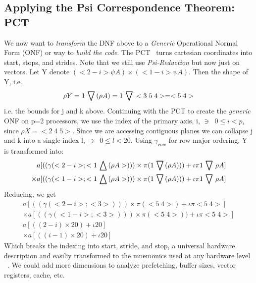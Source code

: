 \subsection* {Applying the Psi Correspondence Theorem: PCT}
We now want to {\em transform} the DNF above to a {\em Generic} Operational Normal Form (ONF) or way 
to {\em build the code}.  The PCT~\cite{muljen94} turns cartesian coordinates into start, stops, and strides.
Note that we still use {\em Psi-Reduction} but now just on vectors.  
Let Y denote $(<2-i> \psi A ) \times ( <1-i> \psi A)$. Then the shape of Y, i.e.
\begin{eqnarray}
\rho Y= 1 \,\bigtriangledown\, (\rho A) = 1 \,\bigtriangledown\, <3\;5\;4> = <5\;4>
\end{eqnarray}
i.e. the bounds for j and k  above.
Continuing with the PCT to create the {\em generic} ONF on p=2 processors, we use the index of the primary axis, i, $\ni\;\;0 \leq  i < p$, since $\rho X = <2\;4\;5>$.
Since we are accessing contiguous planes we can collapse j and k into a single index l, $\ni \;\; 0 \leq l <20$.
Using $\gamma_{row}$ for row major ordering, Y is transformed into:
\small
\begin{eqnarray}
a[ (( \gamma(<2-i >; <1 \,\bigtriangleup\, (\rho A>))) \times \pi ( 1 \,\bigtriangledown\, (\rho A))   )  + \iota \pi 1 \,\bigtriangledown\, \rho A  ] \nonumber \\
\times a[ (( \gamma(<1-i >; <1 \,\bigtriangleup\, (\rho A>))) \times \pi ( 1 \,\bigtriangledown\, (\rho A))   )  + \iota \pi 1 \,\bigtriangledown\, \rho A  ] 
\end{eqnarray}
Reducing, we get
\begin{eqnarray}
a[ (( \gamma(<2-i >; <3>))) \times \pi ( <5\;4>)  + \iota \pi <5\;4> ] \nonumber \\
\times a[ (( \gamma(<1-i >; <3>))) \times \pi ( <5\;4>)   )  + \iota \pi <5\;4>  ]\nonumber \\
a[( (2-i) \times  20)  + \iota 20 ] \nonumber \\
\times a[( (i-1) \times 20 )  + \iota 20 ]
\end{eqnarray}
\normalsize
Which breaks the indexing into start, stride, and stop, a universal hardware description and easiliy transformed
to the mnemonics used at any hardware level ~\cite{fftharry}.
We could add more dimensions to analyze prefetching, buffer sizes, vector registers, cache, etc.
